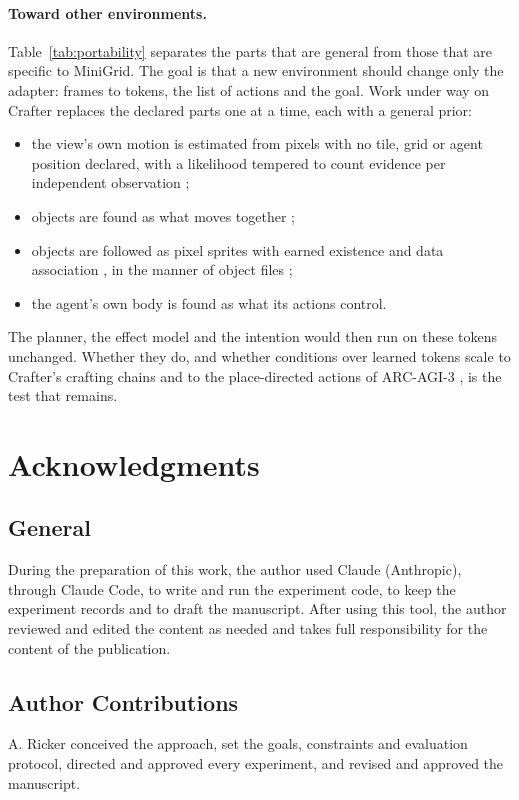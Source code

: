 \documentclass{article}
\begin{document}
\paragraph{Toward other environments.} Table~\ref{tab:portability} separates the parts that are general from those that are specific to MiniGrid. The goal is that a new environment should change only the adapter: frames to tokens, the list of actions and the goal. Work under way on Crafter \cite{Hafner2022} replaces the declared parts one at a time, each with a general prior:
\begin{itemize}
    \item the view's own motion is estimated from pixels with no tile, grid or agent position declared, with a likelihood tempered to count evidence per independent observation \cite{Holmes2017};
    \item objects are found as what moves together \cite{Spelke1990};
    \item objects are followed as pixel sprites \cite{Jojic2001} with earned existence and data association \cite{BarShalom1975,Musicki1994}, in the manner of object files \cite{Kahneman1992};
    \item the agent's own body is found as what its actions control.
\end{itemize}
The planner, the effect model and the intention would then run on these tokens unchanged. Whether they do, and whether conditions over learned tokens scale to Crafter's crafting chains and to the place-directed actions of ARC-AGI-3 \cite{Chollet2019}, is the test that remains.

\section*{Acknowledgments}

\subsection*{General}
During the preparation of this work, the author used Claude (Anthropic), through Claude Code, to write and run the experiment code, to keep the experiment records and to draft the manuscript. After using this tool, the author reviewed and edited the content as needed and takes full responsibility for the content of the publication.

\subsection*{Author Contributions}
A. Ricker conceived the approach, set the goals, constraints and evaluation protocol, directed and approved every experiment, and revised and approved the manuscript.
\end{document}
